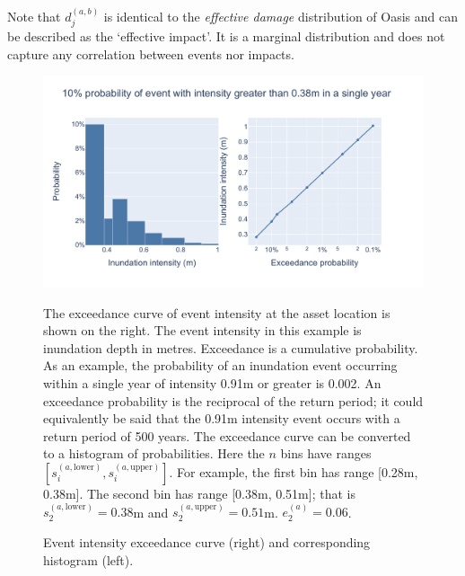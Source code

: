 \documentclass[a4paper,11pt]{extarticle} %
\begin{document}
Note that $d^{(a,b)}_j$ is identical to the {\it effective damage} distribution of Oasis and can be described as the `effective impact'. It is a marginal distribution and does not capture any correlation between events nor impacts.

\begin{figure}[ht]
	
	\begin{framed}
		
		\includegraphics[width=\textwidth]{plots/fig_intensity.pdf}
		
	\end{framed}
	
	\footnotesize
	
	\renewcommand{\arraystretch}{1.01}
	
	\vspace{-3ex}
	
	{\justify
		The exceedance curve of event intensity at the asset location is shown on the right. The event intensity in this example is inundation depth in metres. Exceedance is a cumulative probability. As an example, the probability of an inundation event occurring within a single year of intensity 0.91m or greater is 0.002. An exceedance probability is the reciprocal of the return period; it could equivalently be said that the 0.91m intensity event occurs with a return period of 500 years.
		The exceedance curve can be converted to a histogram of probabilities. Here the $n$ bins have ranges $[s^{(a, \text{lower})}_i, s^{(a, \text{upper})}_i]$. For example, the first bin has range [0.28m, 0.38m]. The second bin has range [0.38m,	0.51m]; that is $s^{(a, \text{lower})}_2 = 0.38$m and $s^{(a, \text{upper})}_2 = 0.51$m. $e^{(a)}_2 = 0.06$.	
		\par}
	
	\vspace{-0.5ex}
	
	\caption{\small Event intensity exceedance curve (right) and corresponding histogram (left).}
	\label{Fig:intensity}
	
\end{figure}
\end{document}
